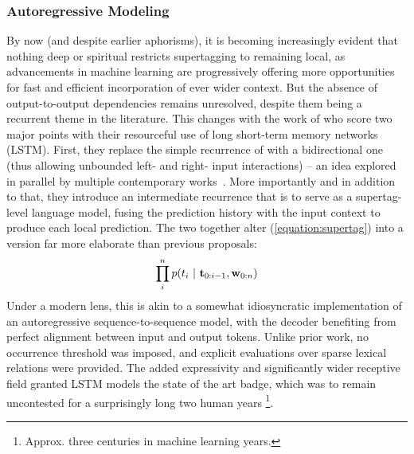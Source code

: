 \subsubsection{Autoregressive Modeling}
By now (and despite earlier aphorisms), it is becoming increasingly evident that nothing deep or spiritual restricts supertagging to remaining local, as advancements in machine learning are progressively offering more opportunities for fast and efficient incorporation of ever wider context.
But the absence of output-to-output dependencies remains unresolved, despite them being a recurrent theme in the literature.
This changes with the work of \citet{vaswani-etal-2016-supertagging} who score two major points with their resourceful use of long short-term memory networks (LSTM).
First, they replace the simple recurrence of \citet{xu-etal-2015-ccg} with a bidirectional one (thus allowing unbounded left- and right- input interactions) --  an idea explored in parallel by multiple contemporary works~\cite[inter alia]{ling-etal-2015-finding,xu-etal-2016-expected,lewis-etal-2016-lstm}.
More importantly and in addition to that, they introduce an intermediate recurrence that is to serve as a supertag-level language model, fusing the prediction history with the input context to produce each local prediction.
The two together alter (\ref{equation:supertag}) into a version far more elaborate than previous proposals:
\begin{equation}\label{equation:lstm_lm}
	\prod_i^n p(t_i \ | \ \mathbf{t}_{0:i-1},\mathbf{w}_{0:n})
\end{equation}
Under a modern lens, this is akin to a somewhat idiosyncratic implementation of an autoregressive sequence-to-sequence model, with the decoder benefiting from perfect alignment between input and output tokens.
Unlike prior work, no occurrence threshold was imposed, and explicit evaluations over sparse lexical relations were provided.
The added expressivity and significantly wider receptive field granted LSTM models the state of the art badge, which was to remain uncontested for a surprisingly long two human years%
	\footnote{Approx. three centuries in machine learning years.}.

